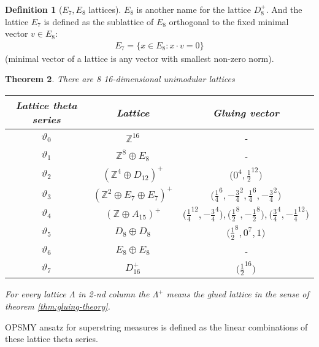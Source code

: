 \documentclass{article}
\newcommand{\ZZ}{\mathbb{Z}}
\newcommand{\br}[1]{\left(#1\right)}
\theoremstyle{plain}
\newtheorem{theorem}{Theorem}[section]
\theoremstyle{definition}
\newtheorem{definition}[theorem]{Definition}
\begin{document}
\begin{definition}[$E_7, E_8$ lattices]
    $E_8$ is another name for the lattice $D_8^+$. 
    And the lattice $E_7$ is defined as the sublattice of $E_8$ orthogonal to the 
    fixed minimal vector $v \in E_8$:
    \begin{align}
        E_7 = \{
            x \in E_8: x \cdot v = 0
        \}
    \end{align}
    (minimal vector of a lattice is any vector with smallest non-zero norm).
\end{definition}

\begin{theorem}\cite{conway}
    There are 8 16-dimensional unimodular lattices
\begin{center}
    \begin{tabular}{|c|c|c|}
        \hline
        Lattice theta series & Lattice & Gluing vector \\
        \hline
        $\vartheta_0$ & $\ZZ^{16}$ & -\\
        \hline
        $\vartheta_1$ & $\ZZ^8 \oplus E_8$ & -\\
        \hline
        $\vartheta_2$ & $\br{\ZZ^4 \oplus D_{12}}^+$ & $\Big( 0^4, \frac{1}{2}^{12} \Big)$ \\
        \hline
        $\vartheta_3$ & $\br{\ZZ^2 \oplus E_7 \oplus E_7}^+$ & 
            $\Big( \frac{1}{4}^6, -\frac{3}{4}^2, \frac{1}{4}^6, -\frac{3}{4}^2 \Big)$ \\
        \hline
        $\vartheta_4$ & $\br{\ZZ \oplus A_{15}}^+$ & 
            $\Big( \frac{1}{4}^{12}, -\frac{3}{4}^4 \Big), 
            \Big( \frac{1}{2}^8, -\frac{1}{2}^8 \Big),
            \Big( \frac{3}{4}^4, -\frac{1}{4}^{12} \Big)$
            \\
        \hline
        $\vartheta_5$ & $D_8 \oplus D_8$ & 
            $\Big( \frac{1}{2}^8, 0^7, 1 \Big)$
            \\
        \hline
        $\vartheta_6$ & $E_8 \oplus E_8$ & - \\
        \hline
        $\vartheta_7$ & $D_{16}^+$ & $\Big( \frac{1}{2}^{16} \Big)$ \\
        \hline
    \end{tabular}
\end{center}
For every lattice $\Lambda$ in 2-nd column the $\Lambda^+$ means the glued lattice 
in the sense of theorem \ref{thm:gluing-theory}. 
\end{theorem}

    OPSMY ansatz for superstring measures is defined as the linear combinations 
    of these lattice theta series.
\end{document}
